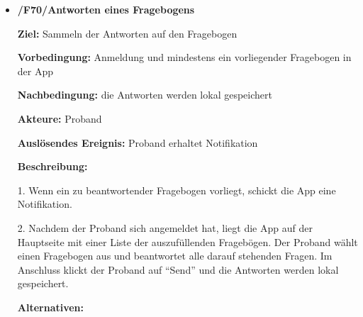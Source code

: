 \documentclass[a4paper]{scrreprt}
\begin{document}
\begin{itemize}
            \item \textbf{/F70/Antworten eines Fragebogens}

                \par \textbf{Ziel: }Sammeln der Antworten auf den Fragebogen
                \par \textbf{Vorbedingung: }Anmeldung und mindestens ein vorliegender Fragebogen in der App
                \par \textbf{Nachbedingung: }die Antworten werden lokal gespeichert
                \par \textbf{Akteure: }Proband
                \par \textbf{Auslösendes Ereignis: }Proband erhaltet Notifikation
                \par \textbf{Beschreibung: }
                \par 1. Wenn ein zu beantwortender Fragebogen vorliegt, schickt die App eine Notifikation.
                \par 2. Nachdem der Proband sich angemeldet hat, liegt die App auf der Hauptseite mit einer Liste der auszufüllenden Fragebögen. Der Proband wählt einen Fragebogen aus und beantwortet alle darauf stehenden Fragen. Im Anschluss klickt der Proband auf ``Send'' und die Antworten werden lokal gespeichert.
                \par \textbf{Alternativen: }
                \begin{figure}[ht]
                    \centering

\end{figure}
\end{itemize}
\end{document}
